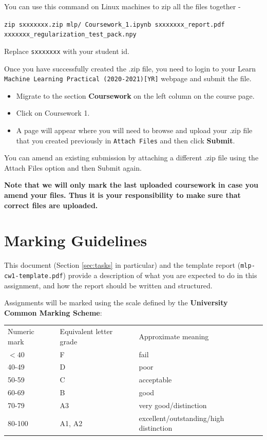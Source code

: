 \documentclass[11pt,]{article}
\begin{document}
You can use this command on Linux machines to zip all the files together - 

\texttt{zip sxxxxxxx.zip mlp/  \texttt{Coursework\_1.ipynb} sxxxxxxx\_report.pdf \\ xxxxxxx\_regularization\_test\_pack.npy}

Replace \texttt{sxxxxxxx} with your student id. 

Once you have successfully created the .zip file, you need to login to your Learn \texttt{Machine Learning Practical (2020-2021)[YR]} webpage and submit the file. 
\begin{itemize}
    \item Migrate to the section \textbf{Coursework} on the left column on the course page. 
    \item Click on Coursework 1.%
    \item A page will appear where you will need to browse and upload your .zip file that you created previously in \texttt{Attach Files} and then click \textbf{Submit}. 
\end{itemize}

You can amend an existing submission by attaching a different .zip file using the Attach Files option and then Submit again.

\textbf{Note that we will only mark the last uploaded coursework in case you amend your files. Thus it is your responsibility to make sure that correct files are uploaded.}

\newpage
\section{Marking Guidelines}
\label{sec:marking-scheme}
This document (Section \ref{sec:tasks} in particular) and the template report (\verb+mlp-cw1-template.pdf+) provide a description of what you are expected to do in this assignment, and how the report should be written and structured.

Assignments will be marked using the scale defined by the \textbf{University Common Marking Scheme}:
\begin{center}
\begin{tabular}{lll}
Numeric mark & Equivalent letter grade & Approximate meaning \\
$< 40$ & F & fail \\
40-49 & D & poor \\
50-59 & C & acceptable \\
60-69 & B & good \\
70-79 & A3 & very good/distinction \\
80-100 & A1, A2 & excellent/outstanding/high distinction
\end{tabular}
\end{center}
\end{document}
